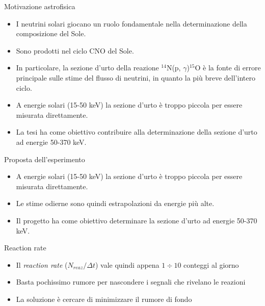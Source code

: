 \documentclass [xcolor=svgnames] {beamer}
\begin{document}
\begin{frame}{Motivazione astrofisica}
	\begin{itemize}
		\item<1-> I neutrini solari giocano un ruolo fondamentale nella determinazione della composizione del Sole.
		\item<2-> Sono prodotti nel ciclo CNO del Sole.
		\item<3-> In particolare, la sezione d'urto della reazione $^{14}$N(p, $\gamma$)$^{15}$O è la fonte di errore principale sulle stime del flusso di neutrini, in quanto la più breve dell'intero ciclo.
		\item<4-> A energie solari (15-50 keV) la sezione d'urto è troppo piccola per essere misurata direttamente.
		\item<5-> La tesi ha come obiettivo contribuire alla determinazione della sezione d'urto ad energie 50-370 keV.
	\end{itemize}
\end{frame}
\begin{frame}{Proposta dell'esperimento}
	\begin{itemize}
		\item<1-> A energie solari (15-50 keV) la sezione d'urto è troppo piccola per essere misurata direttamente.
		\item<2-> Le stime odierne sono quindi estrapolazioni da energie più alte.
		\item<3-> Il progetto ha come obiettivo determinare la sezione d'urto ad energie 50-370 keV.
	\end{itemize}
\end{frame}

\begin{frame}{Reaction rate}
	\begin{itemize}
			\item<1-> Il \emph{reaction rate} ($N_{reaz}/\Delta t$) vale quindi appena $1\div 10$ conteggi al giorno
			\item<2-> Basta pochissimo rumore per nascondere i segnali che rivelano le reazioni
			\item<3-> La soluzione è cercare di minimizzare il rumore di fondo 
		\end{itemize}
\end{frame}
\end{document}
